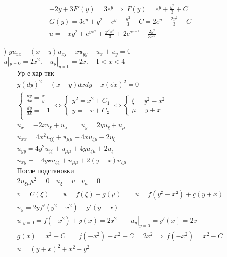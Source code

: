 \begin{enumerate}
\begin{gather*}
   -2y +3F'(y)=3e^{y} \ \Rightarrow \ F(y)  = e^{y} + \frac{y^{2}}{3}+C \\
   G(y)=3e^{y}+y^{2}-e^{y}- \frac{y^{2}}{3}-C = 2e^{y} + \frac{2y^{2}}{3}-C\\
   \boxed{u = -xy^{2}+e^{yx^{2}}+ \frac{y^{2}x^{4}}{3}+2e^{yx^{-1}}+ \frac{2y^{2}}{3x^{2}}}
  \end{gather*}
\item[\text{г})] $yu_{xx}+(x-y)u_{xy}-xu_{yy}-u_{x}+u_{y}=0$ \\
  $u|_{y=0}=2x^{2}, \quad u_{y}|_{y=0}=2x, \quad 1<x<4$ \\
  \begin{gather*}
    \text{Ур-е хар-тик} \\
    y(dy)^{2}-(x-y)dxdy-x(dx)^{2}=0 \\
    \begin{cases}
     \frac{dy}{dx}= \frac{x}{y} \\ \frac{dy}{dx} =-1 \\ 
    \end{cases} \Leftrightarrow 
    \begin{cases}
      y^{2}= x^{2} +C_{1} \\ y = -x +C_{2}
    \end{cases} \Leftrightarrow 
    \begin{cases}
      \xi = y^{2}- x^{2} \\ \mu = y+x
    \end{cases} \\
    u_{x}= -2xu_{\xi}+u_{\mu} \qquad u_{y}= 2yu_{\xi}+u_{\mu} \\
    u_{xx}=4x^{2}u_{\xi\xi}+u_{\mu\mu}-4xu_{\xi\mu}-2u_{\xi} \\
    u_{yy}=4y^{2}u_{\xi\xi}+u_{\mu\mu}+4yu_{\xi\mu}+2u_{\xi} \\
    u_{xy}=-4yxu_{\xi\xi}+u_{\mu\mu}+2(y-x)u_{\xi\mu} \\
    \text{После подстановки} \\
    2u_{\xi\mu}\mu^{2}=0 \quad u_{\xi}=v \quad  v_{\mu} = 0 \\
    v = C(\xi) \qquad u = f(\xi)+g(\mu) \qquad u = f(y^{2}-x^{2})+g(y+x) \\
    u_{y} = 2yf'(y^{2}-x^{2})+g'(y+x) \\
    u|_{y=0} = f(-x^{2}) + g(x)=2x^{2} \qquad u_{y}|_{y=0}=  g'(x) =2x \\
    g(x)=x^{2}+C \qquad f(-x^{2})+x^{2}+C=2x^{2} \ \Rightarrow \ f(-x^{2}) = x^{2}-C \\
    u=(y+x)^{2}+x^{2}-y^{2} \\

\end{gather*}
\end{enumerate}
